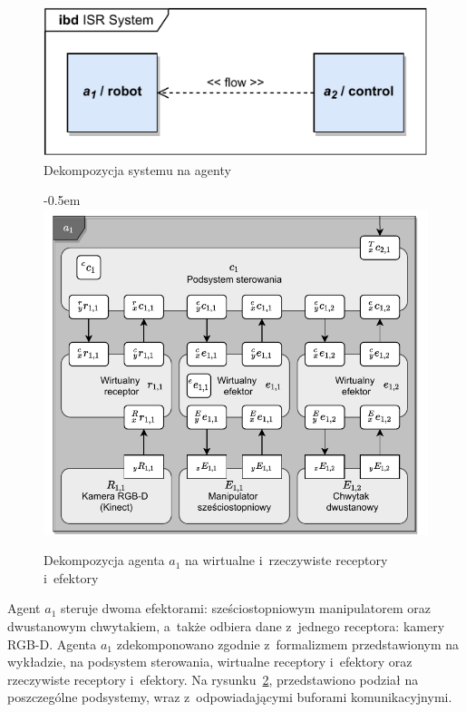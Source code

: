 \begin{figure}[b]
    \centering
    \includegraphics[width=\columnwidth]{figures/ISR-agents.pdf}
    \caption{Dekompozycja systemu na agenty}
    \label{fig:agenty-system}
\end{figure}

\begin{figure}[t]
    \leftskip-0.5em
    \includegraphics[width=1.05\columnwidth]{figures/ISR-agent-decomposition.pdf}
    \caption{Dekompozycja agenta $a_{1}$ na wirtualne i~rzeczywiste receptory i~efektory}
    \label{fig:dekompozycja-agent-1}
\end{figure}

Agent $a_{1}$ steruje dwoma efektorami: sześciostopniowym manipulatorem oraz dwustanowym chwytakiem, a~także odbiera dane z~jednego receptora: kamery RGB-D. Agenta $a_{1}$ zdekomponowano zgodnie z~formalizmem przedstawionym na wykładzie, na podsystem sterowania, wirtualne receptory i~efektory oraz rzeczywiste receptory i~efektory. Na rysunku~\ref{fig:dekompozycja-agent-1}, przedstawiono podział na poszczególne podsystemy, wraz z~odpowiadającymi buforami komunikacyjnymi.